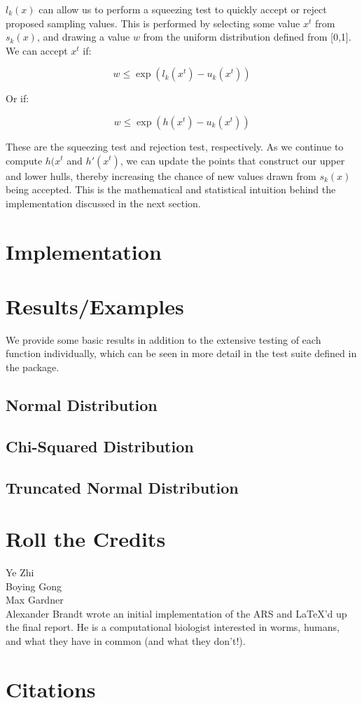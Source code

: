 \documentclass[12pt, oneside]{article}
\begin{document}
\(l_k(x) \) can allow us to perform a squeezing test to quickly accept or reject proposed sampling values.  This is performed by selecting some value \(x^t\) from \(s_k(x)\), and drawing a value \(w\) from the uniform distribution defined from [0,1].  We can accept \(x^t\) if:

\[ w \le \exp(l_k(x^t) - u_k(x^t)) \]

Or if:

\[ w \le \exp(h(x^t) - u_k(x^t)) \]

These are the squeezing test and rejection test, respectively.  As we continue to compute \(h(x^t\) and \(h'(x^t)\), we can update the points that construct our upper and lower hulls, thereby increasing the chance of new values drawn from \(s_k(x)\) being accepted.  This is the mathematical and statistical intuition behind the implementation discussed in the next section.

\section{Implementation}

\section{Results/Examples}

We provide some basic results in addition to the extensive testing of each function individually, which can be seen in more detail in the test suite defined in the package.

\subsection{Normal Distribution}

\subsection{Chi-Squared Distribution}

\subsection{Truncated Normal Distribution}

\section{Roll the Credits}

Ye Zhi \\
Boying Gong \\
Max Gardner \\
Alexander Brandt wrote an initial implementation of the ARS and \LaTeX'd up the final report.  He is a computational biologist interested in worms, humans, and what they have in common (and what they don't!).  \\

\section{Citations}
\end{document}
